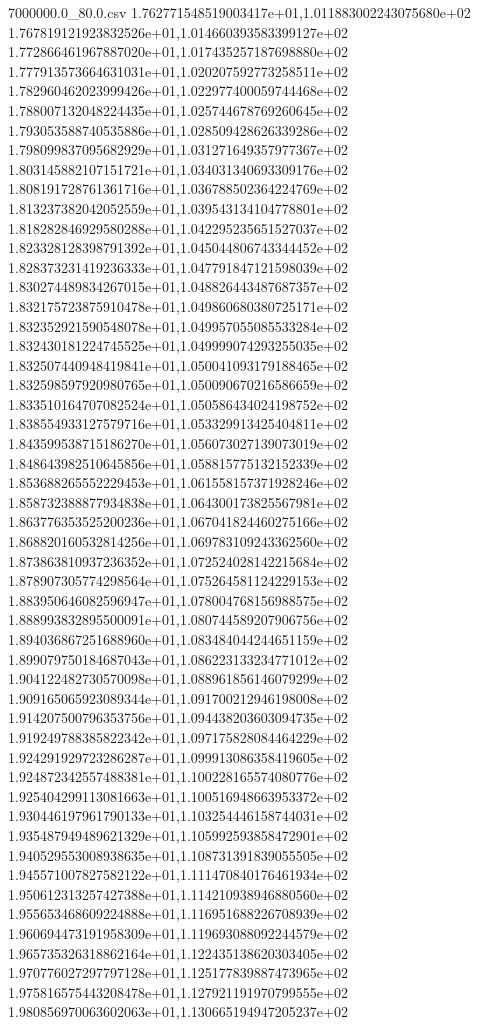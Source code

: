\begin{filecontents*}{7000000.0_80.0.csv}
1.762771548519003417e+01,1.011883002243075680e+02
1.767819121923832526e+01,1.014660393583399127e+02
1.772866461967887020e+01,1.017435257187698880e+02
1.777913573664631031e+01,1.020207592773258511e+02
1.782960462023999426e+01,1.022977400059744468e+02
1.788007132048224435e+01,1.025744678769260645e+02
1.793053588740535886e+01,1.028509428626339286e+02
1.798099837095682929e+01,1.031271649357977367e+02
1.803145882107151721e+01,1.034031340693309176e+02
1.808191728761361716e+01,1.036788502364224769e+02
1.813237382042052559e+01,1.039543134104778801e+02
1.818282846929580288e+01,1.042295235651527037e+02
1.823328128398791392e+01,1.045044806743344452e+02
1.828373231419236333e+01,1.047791847121598039e+02
1.830274489834267015e+01,1.048826443487687357e+02
1.832175723875910478e+01,1.049860680380725171e+02
1.832352921590548078e+01,1.049957055085533284e+02
1.832430181224745525e+01,1.049999074293255035e+02
1.832507440948419841e+01,1.050041093179188465e+02
1.832598597920980765e+01,1.050090670216586659e+02
1.833510164707082524e+01,1.050586434024198752e+02
1.838554933127579716e+01,1.053329913425404811e+02
1.843599538715186270e+01,1.056073027139073019e+02
1.848643982510645856e+01,1.058815775132152339e+02
1.853688265552229453e+01,1.061558157371928246e+02
1.858732388877934838e+01,1.064300173825567981e+02
1.863776353525200236e+01,1.067041824460275166e+02
1.868820160532814256e+01,1.069783109243362560e+02
1.873863810937236352e+01,1.072524028142215684e+02
1.878907305774298564e+01,1.075264581124229153e+02
1.883950646082596947e+01,1.078004768156988575e+02
1.888993832895500091e+01,1.080744589207906756e+02
1.894036867251688960e+01,1.083484044244651159e+02
1.899079750184687043e+01,1.086223133234771012e+02
1.904122482730570098e+01,1.088961856146079299e+02
1.909165065923089344e+01,1.091700212946198008e+02
1.914207500796353756e+01,1.094438203603094735e+02
1.919249788385822342e+01,1.097175828084464229e+02
1.924291929723286287e+01,1.099913086358419605e+02
1.924872342557488381e+01,1.100228165574080776e+02
1.925404299113081663e+01,1.100516948663953372e+02
1.930446197961790133e+01,1.103254446158744031e+02
1.935487949489621329e+01,1.105992593858472901e+02
1.940529553008938635e+01,1.108731391839055505e+02
1.945571007827582122e+01,1.111470840176461934e+02
1.950612313257427388e+01,1.114210938946880560e+02
1.955653468609224888e+01,1.116951688226708939e+02
1.960694473191958309e+01,1.119693088092244579e+02
1.965735326318862164e+01,1.122435138620303405e+02
1.970776027297797128e+01,1.125177839887473965e+02
1.975816575443208478e+01,1.127921191970799555e+02
1.980856970063602063e+01,1.130665194947205237e+02

\end{filecontents*}
